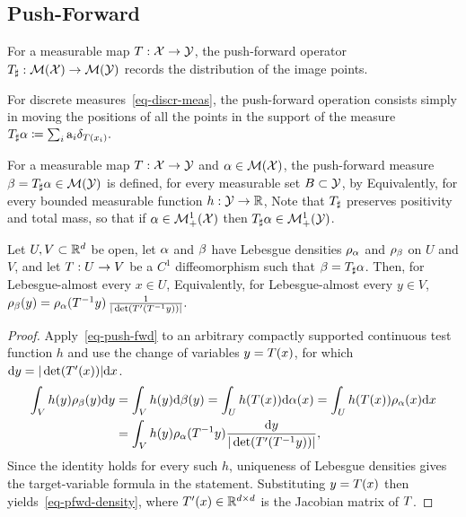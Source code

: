 \subsection{Push-Forward}
\label{sec-push-forward}
For a measurable map $T: \mathcal{X} \rightarrow \mathcal{Y}$, the push-forward operator $T_\sharp: \mathcal{M}(\mathcal{X}) \rightarrow \mathcal{M}(\mathcal{Y})$ records the distribution of the image points.

For discrete measures~\eqref{eq-discr-meas}, the push-forward operation consists simply in moving the positions of all the points in the support of the measure
\(T_{\sharp} \alpha \coloneqq \sum_i \mathrm{a}_i \delta_{T(x_i)}.\)
\begin{defn}\label{defn-pushfwd}
For a measurable map $T: \mathcal{X} \rightarrow \mathcal{Y}$ and $\alpha \in \mathcal{M}(\mathcal{X})$, the push-forward measure $\beta = T_\sharp \alpha \in \mathcal{M}(\mathcal{Y})$ is defined, for every measurable set $B\subset\mathcal{Y}$, by
Equivalently, for every bounded measurable function $h:\mathcal{Y}\to\mathbb{R}$,
Note that $T_\sharp$ preserves positivity and total mass, so that if $\alpha \in \mathcal{M}_+^1(\mathcal{X})$ then $T_\sharp \alpha \in \mathcal{M}_+^1(\mathcal{Y})$.
\end{defn}
\begin{prop}\label{prop-push-forward-densities}
Let $U,V\subset\mathbb{R}^d$ be open, let $\alpha$ and $\beta$ have Lebesgue densities $\rho_{\alpha}$ and $\rho_{\beta}$ on $U$ and $V$, and let $T:U\to V$ be a $C^1$ diffeomorphism such that $\beta=T_\sharp\alpha$. Then, for Lebesgue-almost every $x\in U$,
Equivalently, for Lebesgue-almost every $y\in V$, \(\rho_{\beta}(y)=\rho_{\alpha}(T^{-1}y)\, \frac{1}{|\det(T'(T^{-1}y))|}.\)
\end{prop}
\begin{proof}
Apply~\eqref{eq-push-fwd} to an arbitrary compactly supported continuous test function $h$ and use the change of variables $y=T(x)$, for which $\mathrm{d} y = |\det(T'(x))| \mathrm{d} x$.
\begin{align*}
\int_V h(y)\rho_{\beta}(y) \mathrm{d} y &= \int_V h(y) \mathrm{d} \beta(y) = \int_U h(T(x)) \mathrm{d} \alpha(x) = \int_U h(T(x)) \rho_{\alpha}(x) \mathrm{d} x \\
&= \int_V h(y) \rho_{\alpha}(T^{-1}y) \frac{\mathrm{d} y}{|\det(T'(T^{-1} y))|},
\end{align*}
Since the identity holds for every such $h$, uniqueness of Lebesgue densities gives the target-variable formula in the statement. Substituting $y=T(x)$ then yields~\eqref{eq-pfwd-density}, where $T'(x)\in\mathbb{R}^{d\times d}$ is the Jacobian matrix of $T$.
\end{proof}
